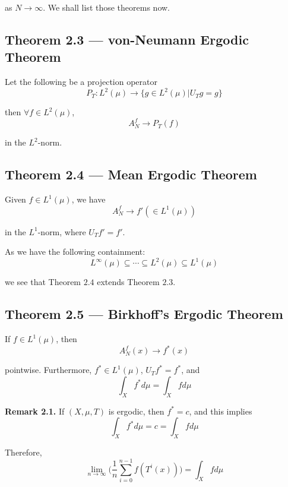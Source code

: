 \documentclass[11pt,a4paper]{article}
\begin{document}
as $N \rightarrow \infty$. We shall list those theorems now.
\subsection*{Theorem 2.3 — von-Neumann Ergodic Theorem} Let the following be a projection operator
$$P_T:L^2(\mu) \rightarrow \{g\in L^2(\mu)  | U_Tg= g\}$$

then $\forall f\in L^2(\mu)$,
$$A_N^f \rightarrow P_T(f)$$

in the $L^2$-norm.

\subsection*{Theorem 2.4 — Mean Ergodic Theorem} Given $f \in L^1(\mu)$, we have
$$A_N^f \rightarrow f' (\in L^1(\mu))$$

in the $L^1$-norm, where $U_Tf' = f'$.

As we have the following containment:
$$L^{\infty}(\mu) \subseteq \cdots \subseteq L^2(\mu) \subseteq L^1(\mu)$$

we see that Theorem $2.4$ extends Theorem $2.3$.
\subsection*{Theorem 2.5 — Birkhoff's Ergodic Theorem} If $f \in L^1(\mu)$, then
$$A_N^f(x) \rightarrow f^*(x)$$

pointwise. Furthermore, $f^* \in L^1(\mu)$, $U_Tf^* = f^*$, and
$$\int_Xf^*d\mu = \int_Xfd\mu$$

\textbf{Remark 2.1.} If $(X,\mu, T)$ is ergodic, then $f^* = c$, and this implies
$$\int_Xf^*d\mu = c = \int_Xfd\mu$$

Therefore,
$$\lim_{n\rightarrow\infty} \bigg(\frac{1}{n}\sum_{i=0}^{n-1}f(T^i(x))\bigg) = \int_Xfd\mu$$
\end{document}
